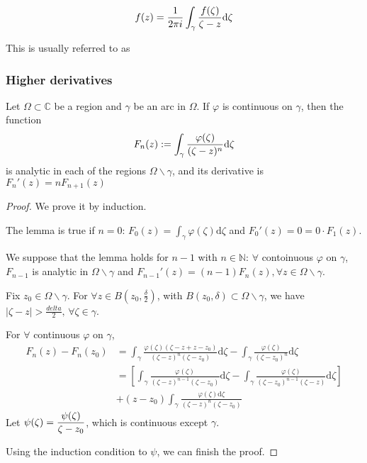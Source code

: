 \[\displaystyle f(z)=\frac{1}{2\pi i}\int_\gamma\frac{f(\zeta)}{\zeta-z}\mathrm{d}\zeta\]

This is usually referred to as 

\subsubsection{Higher derivatives}
\begin{lemma}
    Let  $ \Omega\subset\mathbb{C}$ be a region and  $ \gamma $ be an arc in  $ \Omega $. If  $ \varphi $ is continuous on  $ \gamma $, then the function 
    \[F_n(z):=\displaystyle\int_\gamma\frac{\varphi(\zeta)}{(\zeta-z)^n}\mathrm{d}\zeta\]
    is analytic in each of the regions  $ \Omega\backslash \gamma $, and its derivative is  $ F_n'(z)=nF_{n+1}(z) $
\end{lemma}
\begin{proof}
    We prove it by induction. 
    
    The lemma is true if  $ n=0 $:  $ F_0(z)=\int_\gamma\varphi(\zeta)\mathrm{d}\zeta $ and  $ F_0'(z)=0=0\cdot F_1(z) $.
    
    We suppose that the lemma holds for  $ n-1 $ with  $ n\in \mathbb{N} $:  $ \forall  $ contoinuous $ \varphi $ on  $ \gamma $,  $ F_{n-1} $ is analytic in  $ \Omega\backslash \gamma $ and  $ F_{n-1}'
    (z)=(n-1)F_n(z),\forall z\in \Omega\backslash \gamma $.
    
    Fix  $ z_0\in \Omega\backslash \gamma $. For  $ \forall z\in B(z_0,\frac{\delta}{2}) $, with  $ B(z_0,\delta)\subset \Omega\backslash \gamma $, we have  $ |\zeta-z|>\frac{delta}{2},\,\forall \zeta\in \gamma $.
    
    For  $ \forall  $ continuous  $ \varphi $ on  $ \gamma $,  
    \begin{align*}
        F_n(z)-F_n(z_0)&=\int_\gamma \frac{\varphi(\zeta)(\zeta-z+z-z_0)}{(\zeta-z)^n(\zeta-z_0)} \mathrm{d}\zeta-\int_\gamma\frac{\varphi(\zeta)}{(\zeta-z_0)^n}\mathrm{d}\zeta\\
        &=\left[
        \int_\gamma\frac{\varphi(\zeta)}{(\zeta-z)^{n-1}(\zeta-z_0)}\mathrm{d}\zeta-\int_\gamma\frac{\varphi(\zeta)}{(\zeta-z_0)^{n-1}(\zeta-z)} \mathrm{d}\zeta
    \right]\\
    &+(z-z_0)\int_\gamma\frac{\varphi(\zeta)\mathrm{d}\zeta}{(\zeta-z)^n(\zeta-z_0)}
    \end{align*}   
    Let  $ \psi(\zeta)=\displaystyle\frac{\psi(\zeta)}{\zeta-z_0} $, which is continuous except  $ \gamma $. 
    
    Using the induction condition to  $ \psi $, we can finish the proof. 
\end{proof}